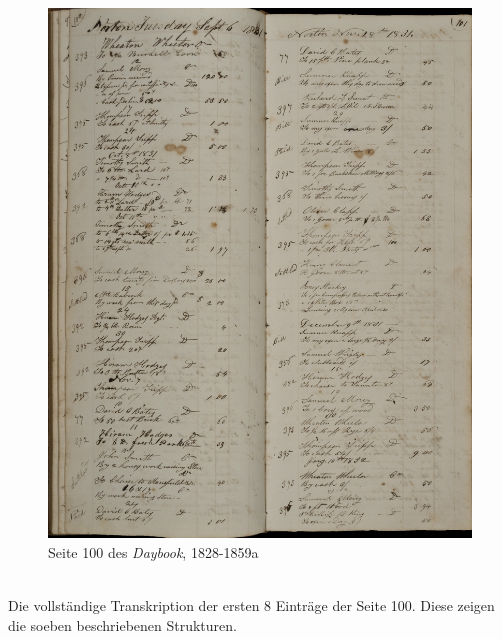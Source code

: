 \documentclass[12pt,a4paper]{article}
\begin{document}
\begin{figure}
\centering
	\includegraphics[width=1\textwidth]{img/wheaton_100_101.jpg}  
    \caption[Seite 100 des \textit{Daybook, \protect\url{http://hdl.handle.net/11040/17982}}, 1828-1859]{Seite 100 des \textit{Daybook}, 1828-1859a} \label{fig:wheaton}
\end{figure}
\\
Die vollständige Transkription der ersten 8 Einträge der Seite 100. Diese zeigen die soeben beschriebenen Strukturen.
\\
\\
\end{document}
